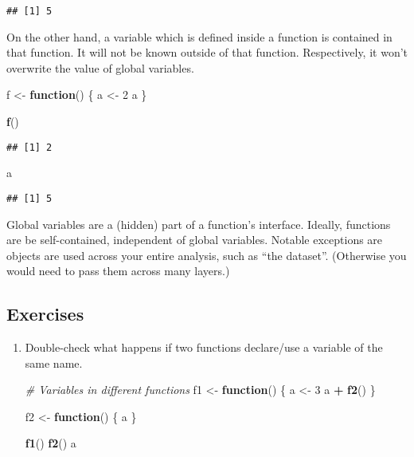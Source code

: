\documentclass[]{book}
\newenvironment{Shaded}{\begin{snugshade}}{\end{snugshade}}
\newcommand{\CommentTok}[1]{\textcolor[rgb]{0.56,0.35,0.01}{\textit{#1}}}
\newcommand{\ControlFlowTok}[1]{\textcolor[rgb]{0.13,0.29,0.53}{\textbf{#1}}}
\newcommand{\DecValTok}[1]{\textcolor[rgb]{0.00,0.00,0.81}{#1}}
\newcommand{\KeywordTok}[1]{\textcolor[rgb]{0.13,0.29,0.53}{\textbf{#1}}}
\newcommand{\NormalTok}[1]{#1}
\newcommand{\OperatorTok}[1]{\textcolor[rgb]{0.81,0.36,0.00}{\textbf{#1}}}
\newcommand{\StringTok}[1]{\textcolor[rgb]{0.31,0.60,0.02}{#1}}
\begin{document}
\begin{verbatim}
## [1] 5
\end{verbatim}

On the other hand, a variable which is defined inside a function is contained in that function.
It will not be known outside of that function.
Respectively, it won't overwrite the value of global variables.

\begin{Shaded}
\begin{Highlighting}[]
\NormalTok{f <-}\StringTok{ }\ControlFlowTok{function}\NormalTok{() \{}
\NormalTok{  a <-}\StringTok{ }\DecValTok{2}
\NormalTok{  a}
\NormalTok{\}}

\KeywordTok{f}\NormalTok{()}
\end{Highlighting}
\end{Shaded}

\begin{verbatim}
## [1] 2
\end{verbatim}

\begin{Shaded}
\begin{Highlighting}[]
\NormalTok{a}
\end{Highlighting}
\end{Shaded}

\begin{verbatim}
## [1] 5
\end{verbatim}

Global variables are a (hidden) part of a function's interface.
Ideally, functions are be self-contained, independent of global variables.
Notable exceptions are objects are used across your entire analysis, such as ``the dataset''.
(Otherwise you would need to pass them across many layers.)

\hypertarget{exercises-16}{%
\subsection{Exercises}\label{exercises-16}}

\begin{enumerate}
\def\labelenumi{\arabic{enumi}.}
\item
  Double-check what happens if two functions declare/use a variable of the same name.

\begin{Shaded}
\begin{Highlighting}[]
\CommentTok{# Variables in different functions}
\NormalTok{f1 <-}\StringTok{ }\ControlFlowTok{function}\NormalTok{() \{}
\NormalTok{  a <-}\StringTok{ }\DecValTok{3}
\NormalTok{  a }\OperatorTok{+}\StringTok{ }\KeywordTok{f2}\NormalTok{()}
\NormalTok{\}}

\NormalTok{f2 <-}\StringTok{ }\ControlFlowTok{function}\NormalTok{() \{}
\NormalTok{  a}
\NormalTok{\}}

\KeywordTok{f1}\NormalTok{()}
\KeywordTok{f2}\NormalTok{()}
\NormalTok{a}
\end{Highlighting}
\end{Shaded}
\end{enumerate}
\end{document}
